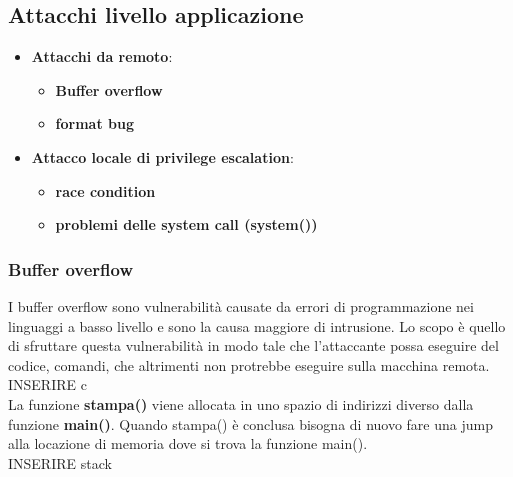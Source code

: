 \documentclass[12pt]{article}
\begin{document}
		\subsection{Attacchi livello applicazione}
			\begin{itemize}
				\item \textbf{Attacchi da remoto}:
				\begin{itemize}
					\item \textbf{Buffer overflow}
					\item \textbf{format bug}				
				\end{itemize}
				\item \textbf{Attacco locale di privilege escalation}:
				\begin{itemize}
					\item \textbf{race condition}
					\item \textbf{problemi delle system call (system())}
				\end{itemize}
			\end{itemize}
			\subsubsection{Buffer overflow}
				I buffer overflow sono vulnerabilità causate da errori di programmazione nei linguaggi a basso livello e sono la causa maggiore di intrusione. Lo scopo è quello di sfruttare questa vulnerabilità in modo tale che l'attaccante possa eseguire del codice, comandi, che altrimenti non protrebbe eseguire sulla macchina remota.\\
				
				INSERIRE c\\
				
				La funzione \textbf{stampa()} viene allocata in uno spazio di indirizzi diverso dalla funzione \textbf{main()}. Quando stampa() è conclusa bisogna di nuovo fare una jump alla locazione di memoria dove si trova la funzione main().\\
				
				INSERIRE stack\\
				
\end{document}
